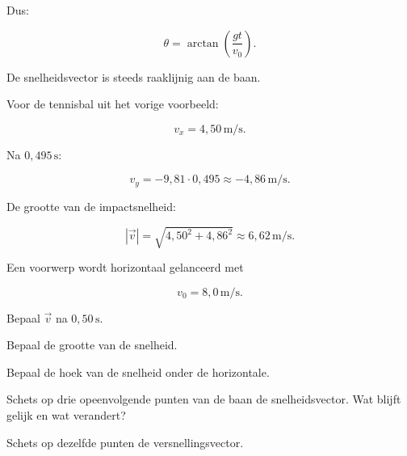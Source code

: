 \documentclass{ximera}
\begin{document}
Dus:

\[
\boxed{
\theta
=
\arctan\left(\frac{gt}{v_0}\right).
}
\]

De snelheidsvector is steeds raaklijnig aan de baan.


\begin{voorbeeld}

Voor de tennisbal uit het vorige voorbeeld:

\[
v_x=4,50\,\mathrm{m/s}.
\]

Na $0,495\,\mathrm{s}$:

\[
v_y
=
-9,81\cdot0,495
\approx-4,86\,\mathrm{m/s}.
\]

De grootte van de impactsnelheid:

\[
|\vec v|
=
\sqrt{4,50^2+4,86^2}
\approx6,62\,\mathrm{m/s}.
\]

\end{voorbeeld}


\begin{oefening}{\oefU\ESS}

Een voorwerp wordt horizontaal gelanceerd met

\[
v_0=8,0\,\mathrm{m/s}.
\]

\begin{question}
Bepaal $\vec v$ na $0,50\,\mathrm{s}$.
\end{question}

\begin{question}
Bepaal de grootte van de snelheid.
\end{question}

\begin{question}
Bepaal de hoek van de snelheid onder de horizontale.
\end{question}

\begin{question}
Schets op drie opeenvolgende punten van de baan de snelheidsvector.
Wat blijft gelijk en wat verandert?
\end{question}

\begin{question}
Schets op dezelfde punten de versnellingsvector.
\end{question}

\end{oefening}



\end{document}
